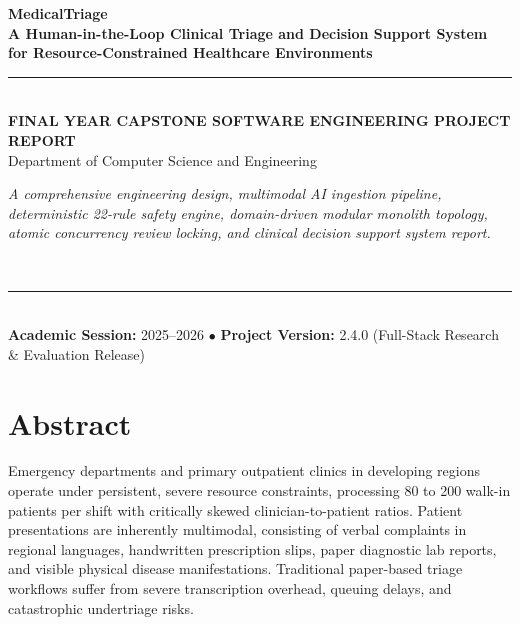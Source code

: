 \documentclass[11pt,a4paper,oneside]{report}
\begin{document}
\begin{titlepage}
  \centering
  \vspace*{20mm}
  
  {\Huge \textbf{\color{PrimaryTeal}MedicalTriage}}\\[5mm]
  {\Large \textbf{A Human-in-the-Loop Clinical Triage and Decision Support System for Resource-Constrained Healthcare Environments}}\\[15mm]
  
  \rule{\textwidth}{1.2pt}\\[10mm]
  
  {\LARGE \textbf{FINAL YEAR CAPSTONE SOFTWARE ENGINEERING PROJECT REPORT}}\\[5mm]
  {\large Department of Computer Science and Engineering}\\[15mm]
  
  \begin{minipage}{0.85\textwidth}
    \centering \itshape \color{MutedGray}
    A comprehensive engineering design, multimodal AI ingestion pipeline,
    deterministic 22-rule safety engine, domain-driven modular monolith topology,
    atomic concurrency review locking, and clinical decision support system report.
  \end{minipage}\\[30mm]
  
  \vfill
  
  \rule{\textwidth}{0.4pt}\\[4mm]
  {\small \textbf{Academic Session:} 2025--2026 \quad $\bullet$ \quad \textbf{Project Version:} 2.4.0 (Full-Stack Research \& Evaluation Release)}
\end{titlepage}

\setcounter{page}{2}

\chapter*{Abstract}

Emergency departments and primary outpatient clinics in developing regions operate under persistent, severe resource constraints, processing 80 to 200 walk-in patients per shift with critically skewed clinician-to-patient ratios. Patient presentations are inherently multimodal, consisting of verbal complaints in regional languages, handwritten prescription slips, paper diagnostic lab reports, and visible physical disease manifestations. Traditional paper-based triage workflows suffer from severe transcription overhead, queuing delays, and catastrophic undertriage risks.
\end{document}
